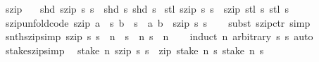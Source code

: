 \begin{isabellebody}
%
\endisatagdocument
{\isafolddocument}%
%
\isadelimdocument
%
\endisadelimdocument
{}\isamarkupfalse%
\ szip\ \isanewline
\ \ {\isachardoublequoteopen}shd\ {\isacharparenleft}szip\ s{}\ s{}{\isacharparenright}\ {\isacharequal}\ {\isacharparenleft}shd\ s{}{\isacharcomma}\ shd\ s{}{\isacharparenright}{\isachardoublequoteclose}\isanewline
{\isacharbar}\ {\isachardoublequoteopen}stl\ {\isacharparenleft}szip\ s{}\ s{}{\isacharparenright}\ {\isacharequal}\ szip\ {\isacharparenleft}stl\ s{}{\isacharparenright}\ {\isacharparenleft}stl\ s{}{\isacharparenright}{\isachardoublequoteclose}\isanewline
\isanewline
{}\isamarkupfalse%
\ szip{\isacharunderscore}unfold{\isacharbrackleft}code{\isacharbrackright}{\isacharcolon}\ {\isachardoublequoteopen}szip\ {\isacharparenleft}a\ {\isacharhash}{\isacharhash}\ s{}{\isacharparenright}\ {\isacharparenleft}b\ {\isacharhash}{\isacharhash}\ s{}{\isacharparenright}\ {\isacharequal}\ {\isacharparenleft}a{\isacharcomma}\ b{\isacharparenright}\ {\isacharhash}{\isacharhash}\ {\isacharparenleft}szip\ s{}\ s{}{\isacharparenright}{\isachardoublequoteclose}\isanewline
%
\isadelimproof
\ \ %
\endisadelimproof
%
\isatagproof
{}\isamarkupfalse%
\ {\isacharparenleft}subst\ szip{\isachardot}ctr{\isacharparenright}\ simp%
\endisatagproof
{\isafoldproof}%
%
\isadelimproof
\isanewline
%
\endisadelimproof
\isanewline
{}\isamarkupfalse%
\ snth{\isacharunderscore}szip{\isacharbrackleft}simp{\isacharbrackright}{\isacharcolon}\ {\isachardoublequoteopen}szip\ s{}\ s{}\ {\isacharbang}{\isacharbang}\ n\ {\isacharequal}\ {\isacharparenleft}s{}\ {\isacharbang}{\isacharbang}\ n{\isacharcomma}\ s{}\ {\isacharbang}{\isacharbang}\ n{\isacharparenright}{\isachardoublequoteclose}\isanewline
%
\isadelimproof
\ \ %
\endisadelimproof
%
\isatagproof
{}\isamarkupfalse%
\ {\isacharparenleft}induct\ n\ arbitrary{\isacharcolon}\ s{}\ s{}{\isacharparenright}\ auto%
\endisatagproof
{\isafoldproof}%
%
\isadelimproof
\isanewline
%
\endisadelimproof
\isanewline
{}\isamarkupfalse%
\ stake{\isacharunderscore}szip{\isacharbrackleft}simp{\isacharbrackright}{\isacharcolon}\isanewline
\ \ {\isachardoublequoteopen}stake\ n\ {\isacharparenleft}szip\ s{}\ s{}{\isacharparenright}\ {\isacharequal}\ zip\ {\isacharparenleft}stake\ n\ s{}{\isacharparenright}\ {\isacharparenleft}stake\ n\ s{}{\isacharparenright}{\isachardoublequoteclose}\isanewline

\end{isabellebody}
